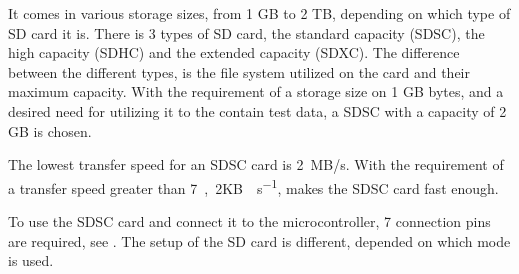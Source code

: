 It comes in various storage sizes, from 1 GB to 2 TB, depending on which type of SD card it is\cite{SDassociation}. There is 3 types of SD card, the standard capacity (SDSC), the high capacity (SDHC) and the extended capacity (SDXC). The difference between the different types, is the file system utilized on the card and their maximum capacity. With the requirement of a storage size on 1 GB bytes, and a desired need for utilizing it to the contain test data, a SDSC with a capacity of 2 GB is chosen.

The lowest transfer speed for an SDSC card is \si{2 MB/s}\cite{SDassociation}. With the requirement of a transfer speed greater than \si{7,2}\si{KB \cdot s^{-1}}, makes the SDSC card fast enough. 

To use the SDSC card and connect it to the microcontroller, 7 connection pins are required, see . The setup of the SD card is different, depended on which mode is used.

